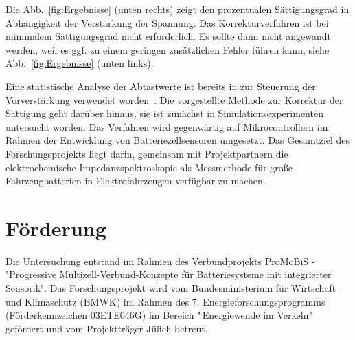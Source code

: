 \smallskip
Die Abb.~\ref{fig:Ergebnisse} (unten rechts) zeigt den prozentualen Sättigungsgrad in Abhängigkeit der Verstärkung der Spannung. Das Korrekturverfahren ist bei minimalem Sättigungsgrad nicht erforderlich. Es sollte dann nicht angewandt werden, weil es ggf. zu einem geringen zusätzlichen Fehler führen kann, siehe Abb.~\ref{fig:Ergebnisse} (unten links). 

Eine statistische Analyse der Abtastwerte ist bereits in zur Steuerung der Vorverstärkung verwendet worden~\cite{Frahm-2023}. Die vorgestellte Methode zur Korrektur der Sättigung geht darüber hinaus, sie ist zunächst in Simulationsexperimenten untersucht worden. Das Verfahren wird gegenwärtig auf Mikrocontrollern im Rahmen der Entwicklung von Batteriezellsensoren umgesetzt. Das Gesamtziel des Forschungsprojekts liegt darin, gemeinsam mit Projektpartnern die elektrochemische Impedanzspektroskopie als Messmethode für große Fahrzeugbatterien in Elektrofahrzeugen verfügbar zu machen.

\section*{Förderung}
Die Untersuchung entstand im Rahmen des Verbundprojekts ProMoBiS - "Progressive Multizell-Verbund-Konzepte für Batteriesysteme mit integrierter Sensorik". Das Forschungsprojekt wird vom Bundesministerium für Wirtschaft und Klimaschutz (BMWK) im Rahmen des 7. Energieforschungsprogramms (Förderkennzeichen 03ETE046G) im Bereich "\,Energiewende im Verkehr"\,gefördert und vom Projektträger Jülich betreut.
   
